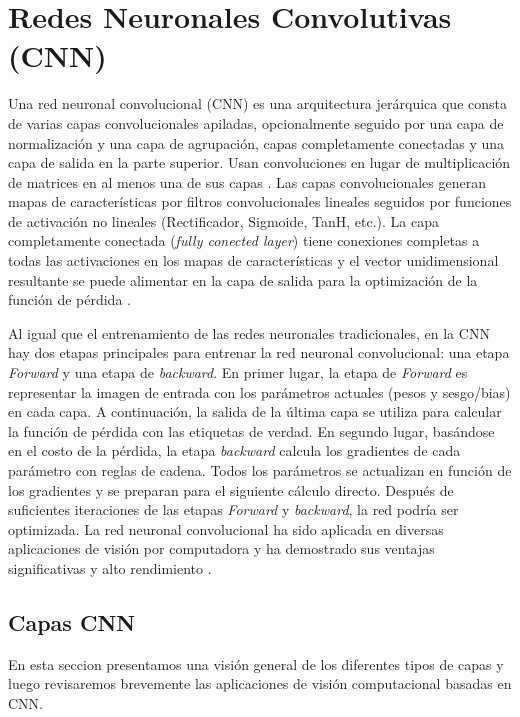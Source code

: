 \section{Redes Neuronales Convolutivas (CNN)}\label{sec:cnn}


Una red neuronal convolucional (CNN) es una arquitectura jerárquica \cite{LeCun} que consta de varias capas convolucionales apiladas, opcionalmente seguido por una capa de normalización y una capa de agrupación, capas completamente conectadas y una capa de salida en la parte superior. Usan convoluciones en lugar de multiplicación de matrices en al menos una de sus capas \cite{TheDLBook}.  Las capas convolucionales generan mapas de características por filtros convolucionales lineales seguidos por funciones de activación no lineales (Rectificador, Sigmoide, TanH, etc.). La capa completamente conectada (\textit{fully conected layer}) tiene conexiones completas a todas las activaciones en los mapas de características y el vector unidimensional resultante se puede alimentar en la capa de salida para la optimización de la función de pérdida .

Al igual que el entrenamiento de las redes neuronales tradicionales, en la CNN hay dos etapas principales para entrenar la red neuronal convolucional: una etapa \textit{Forward}  y una etapa de \textit{backward}.  En primer lugar, la etapa de \textit{Forward} es representar la imagen de entrada con los parámetros actuales (pesos y sesgo/bias) en cada capa. A continuación, la salida de la última capa se utiliza para calcular la función de pérdida con las etiquetas de verdad. En segundo lugar, basándose en el costo de la pérdida, la etapa \textit{backward} calcula los gradientes de cada parámetro con reglas de cadena. Todos los parámetros se actualizan en función de los gradientes y se preparan para el siguiente cálculo directo. Después de suficientes iteraciones de las etapas \textit{Forward} y \textit{backward}, la red podría ser optimizada. La red neuronal convolucional ha sido aplicada en diversas aplicaciones de visión por computadora y ha demostrado sus ventajas significativas y alto rendimiento \cite{TheDLBook}.

\subsection {Capas CNN}

En esta seccion presentamos una visión general de los diferentes tipos de capas y luego revisaremos brevemente las aplicaciones de visión computacional basadas en CNN.


